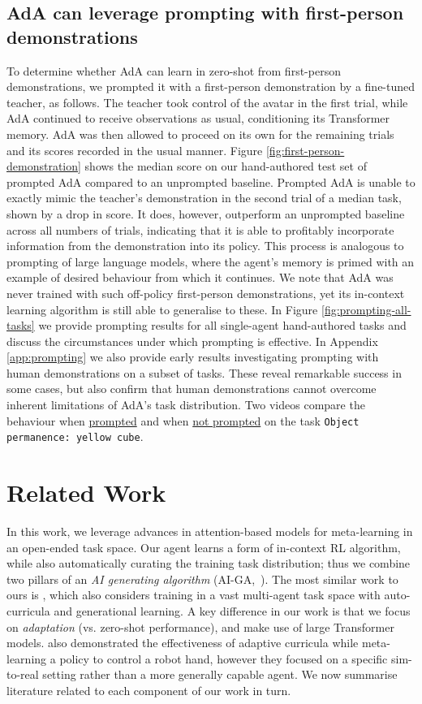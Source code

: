 \documentclass[11pt, a4paper, logo, copyright]{deepmind}
\begin{document}
\subsection{AdA can leverage prompting with first-person demonstrations}
To determine whether AdA can learn in zero-shot from first-person demonstrations, we prompted it with a first-person demonstration by a fine-tuned teacher, as follows. The teacher took control of the avatar in the first trial, while AdA continued to receive observations as usual, conditioning its Transformer memory. AdA was then allowed to proceed on its own for the remaining trials and its scores recorded in the usual manner.
Figure \ref{fig:first-person-demonstration} shows the median score on our hand-authored test set of prompted AdA compared to an unprompted baseline. Prompted AdA is unable to exactly mimic the teacher's demonstration in the second trial of a median task, shown by a drop in score. It does, however, outperform an unprompted baseline across all numbers of trials, indicating that it is able to profitably incorporate information from the demonstration into its policy. This process is analogous to prompting of large language models, where the agent's memory is primed with an example of desired behaviour from which it continues. We note that AdA was never trained with such off-policy first-person demonstrations, yet its in-context learning algorithm is still able to generalise to these.
In Figure \ref{fig:prompting-all-tasks} we provide prompting results for all single-agent hand-authored tasks and discuss the circumstances under which prompting is effective. In Appendix \ref{app:prompting} we also provide early results investigating prompting with human demonstrations on a subset of tasks. These reveal remarkable success in some cases, but also confirm that human demonstrations cannot  overcome inherent limitations of AdA's task distribution. Two videos compare the behaviour when \href{https://youtu.be/jdf4jkiJYa4}{prompted} and when \href{https://youtu.be/CuxPknjnYOI}{not prompted} on the task \texttt{Object permanence: yellow cube}.
\section{Related Work} \label{sec:related_work}
In this work, we leverage advances in attention-based models for meta-learning in an open-ended task space. Our agent learns a form of in-context RL algorithm, while also automatically curating the training task distribution; thus we combine two pillars of an \emph{AI generating algorithm} (AI-GA,~\citet{clune2019aiga}). The most similar work to ours is \citet{xland}, which also considers training in a vast multi-agent task space with auto-curricula and generational learning. A key difference in our work is that we focus on \emph{adaptation} (vs. zero-shot performance), and make use of large Transformer models. \citet{akkaya2019solving} also demonstrated the effectiveness of adaptive curricula while meta-learning a policy to control a robot hand, however they focused on a specific sim-to-real setting rather than a more generally capable agent. We now summarise literature related to each component of our work in turn.
\end{document}
